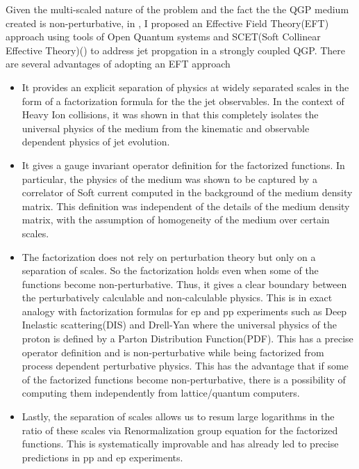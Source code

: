 \documentclass[letter,11pt]{article}
\begin{document}
Given the multi-scaled nature of the problem and the fact the the QGP medium created is non-perturbative,  in \cite{Vaidya:2020lih}, I proposed an Effective Field Theory(EFT) approach using tools of Open Quantum systems and SCET(Soft Collinear Effective Theory)(\cite{Bauer:2002aj,Bauer:2003mga,Manohar:2006nz,Bauer:2000yr,Bauer:2001ct,Bauer:2002nz}) to address jet propgation in a strongly coupled QGP. There are several advantages of adopting an EFT approach 
\begin{itemize}
\item
It provides an explicit separation of physics at widely separated scales in the form of a factorization formula for the the jet observables. In the context of Heavy Ion collisions, it was shown in \cite{Vaidya:2020lih} that this completely isolates the universal physics of the medium from the kinematic and observable dependent physics of jet evolution.  
\item
It gives a gauge invariant operator definition for the factorized functions. In particular, the physics of the medium was shown to be captured by a correlator of Soft current computed in the background of the medium density matrix. This definition was independent of the details of the medium density matrix, with the assumption of homogeneity of the medium over certain scales. 
\item 
The factorization does not rely on perturbation theory but only on a separation of scales. So the factorization holds even when some of the functions become non-perturbative. Thus, it gives a clear boundary between the perturbatively calculable and non-calculable physics. This is in exact analogy with factorization formulas for ep and pp experiments such as Deep Inelastic scattering(DIS) and Drell-Yan where the universal physics of the proton is defined by a Parton Distribution Function(PDF). This has a precise operator definition and is non-perturbative while being factorized from process dependent perturbative physics. This has the advantage that if some of the factorized functions become non-perturbative, there is a possibility of computing them independently from lattice/quantum computers.
\item 
Lastly, the separation of scales allows us to resum large logarithms in the ratio of these scales via Renormalization group equation for the factorized functions. This is systematically improvable and has already led to precise predictions in pp and ep experiments.
\end{itemize}
\end{document}
